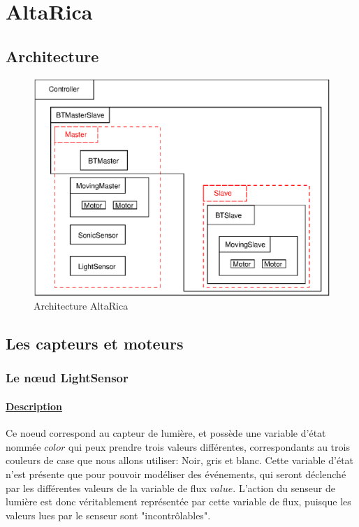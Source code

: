  \section{AltaRica}

  \subsection{Architecture}
  \begin{figure}[!ht]
   \begin{center}
    \includegraphics{ARmodel.eps}
    \caption{Architecture AltaRica}
   \end{center}
  \end{figure}

  \subsection{Les capteurs et moteurs}
    
   \subsubsection{Le n\oe{}ud LightSensor}

    \paragraph{\underline{Description\\}}
    Ce noeud correspond au capteur de lumière, et possède une variable
    d'état nommée $color$ qui   peux prendre trois valeurs différentes,
    correspondants au trois couleurs de case que nous allons utiliser:
    Noir, gris et blanc. Cette variable d'état n'est présente que pour
    pouvoir modéliser des événements, qui seront déclenché par les
    différentes valeurs de la variable de flux $value$. L'action du
    senseur de lumière est donc véritablement représentée par cette
    variable de flux, puisque les valeurs lues par le senseur sont
    "incontrôlables".

